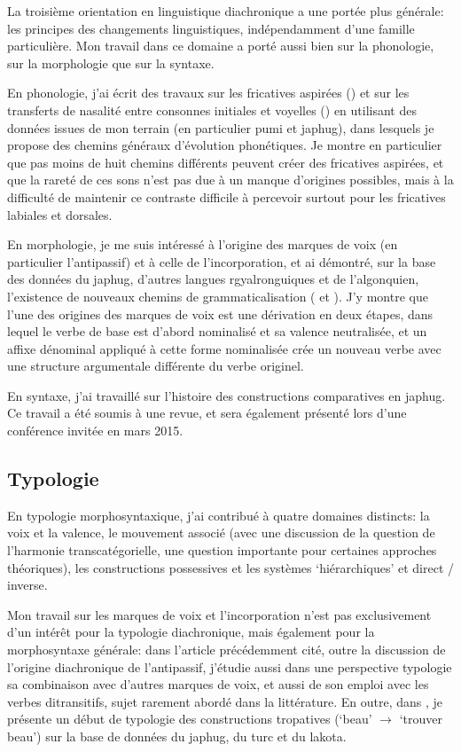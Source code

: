 \documentclass[oldfontcommands,oneside,a4paper,11pt]{article}
\begin{document}
 La troisième orientation en linguistique diachronique a une portée plus générale: les principes des changements linguistiques, indépendamment d'une famille particulière. Mon travail dans ce domaine a porté aussi bien sur la phonologie, sur la morphologie que sur la syntaxe.
 
 En phonologie, j'ai écrit des travaux sur les fricatives aspirées (\citealt{jacques11lingua}) et sur les transferts de nasalité entre consonnes initiales et voyelles (\citealt{michaud-jacques12nasalite}) en utilisant des données issues de mon terrain (en particulier pumi et japhug), dans lesquels je propose des chemins généraux d'évolution phonétiques. Je montre en particulier que pas moins de huit chemins différents peuvent créer des fricatives aspirées, et que la rareté de ces sons n'est pas due à un manque d'origines possibles, mais à la difficulté de maintenir ce contraste difficile à percevoir surtout pour les fricatives labiales et dorsales.  
 
En morphologie, je me suis intéressé à l'origine des marques de voix (en particulier l'antipassif) et à celle de l'incorporation, et ai démontré, sur la base des données du japhug, d'autres langues rgyalronguiques et de l'algonquien, l'existence de nouveaux chemins de grammaticalisation  (\citealt{jacques12incorp} et \citealt{jacques14antipassive}). J'y montre que l'une des origines des marques de voix est une dérivation en deux étapes, dans lequel le verbe de base est d'abord nominalisé et sa valence neutralisée, et  un affixe dénominal appliqué à cette forme nominalisée crée un nouveau verbe avec une structure argumentale différente du verbe originel. 

En syntaxe, j'ai travaillé sur l'histoire des constructions comparatives en japhug. Ce travail a été soumis à une revue, et sera également présenté lors d'une conférence invitée en mars 2015.
 
 
\subsection{Typologie}  \label{sec:typologie}
En typologie morphosyntaxique, j'ai contribué à quatre domaines distincts: la voix et la valence, le mouvement associé (avec une discussion de la question de l'harmonie transcatégorielle, une question importante pour certaines approches théoriques), les constructions possessives et les systèmes  `hiérarchiques' et direct / inverse.

Mon travail sur les marques de voix et l'incorporation n'est pas exclusivement d'un intérêt pour la typologie diachronique, mais également pour la morphosyntaxe générale: dans l'article \citet{jacques14antipassive} précédemment cité, outre la discussion de l'origine diachronique de l'antipassif, j'étudie aussi dans une perspective typologie sa combinaison avec d'autres marques de voix, et aussi de son emploi avec les verbes ditransitifs, sujet rarement abordé dans la littérature. En outre, dans \citet{jacques13tropative}, je présente un début de typologie des constructions tropatives (`beau' $\rightarrow$ `trouver beau') sur la base de données du japhug, du turc et du lakota. 
\end{document}
